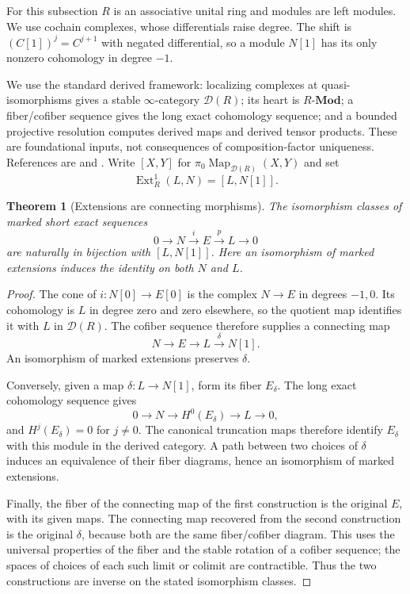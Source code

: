 \documentclass[11pt]{article}
\newtheorem{theorem}{Theorem}[section]
\theoremstyle{definition}
\theoremstyle{remark}\newtheorem{remark}[theorem]{Remark}
\begin{document}
For this subsection $R$ is an associative unital ring and modules are left
modules.  We use cochain complexes, whose differentials raise degree.
The shift is $(C[1])^j=C^{j+1}$ with negated differential, so a module
$N[1]$ has its only nonzero cohomology in degree $-1$.

We use the standard derived framework: localizing complexes at
quasi-isomorphisms gives a stable $\infty$-category $\mathcal D(R)$;
its heart is $R\text{-}\mathbf{Mod}$; a fiber/cofiber sequence gives the
long exact cohomology sequence; and a bounded projective resolution
computes derived maps and derived tensor products.  These are foundational
inputs, not consequences of composition-factor uniqueness.  References
are \cite[\S1.3]{HA} and \cite[Tags 06XP, 0643]{Stacks}.
Write $[X,Y]$ for $\pi_0\operatorname{Map}_{\mathcal D(R)}(X,Y)$ and set
\[
 \operatorname{Ext}^1_R(L,N)=[L,N[1]].
\]

\begin{theorem}[Extensions are connecting morphisms]
\label{t:extension-classification}
The isomorphism classes of marked short exact sequences
\[
 0\longrightarrow N\xrightarrow{i}E\xrightarrow{p}L\longrightarrow0
\]
are naturally in bijection with $[L,N[1]]$.  Here an isomorphism of marked
extensions induces the identity on both $N$ and $L$.
\end{theorem}
\begin{proof}
The cone of $i:N[0]\to E[0]$ is the complex $N\to E$ in degrees
$-1,0$.  Its cohomology is $L$ in degree zero and zero elsewhere, so
the quotient map identifies it with $L$ in $\mathcal D(R)$.  The cofiber
sequence therefore supplies a connecting map
\[
 N\longrightarrow E\longrightarrow L\xrightarrow{\delta}N[1].
\]
An isomorphism of marked extensions preserves $\delta$.

Conversely, given a map $\delta:L\to N[1]$, form its fiber $E_\delta$.
The long exact cohomology sequence gives
\[
 0\longrightarrow N\longrightarrow H^0(E_\delta)
 \longrightarrow L\longrightarrow0,
\]
and $H^j(E_\delta)=0$ for $j\neq0$.  The canonical truncation maps
therefore identify $E_\delta$ with this module in the derived category.
A path between two choices of $\delta$ induces an equivalence of their
fiber diagrams, hence an isomorphism of marked extensions.

Finally, the fiber of the connecting map of the first construction is
the original $E$, with its given maps.  The connecting map recovered
from the second construction is the original $\delta$, because both
are the same fiber/cofiber diagram.  This uses the universal properties
of the fiber and the stable rotation of a cofiber sequence; the spaces
of choices of each such limit or colimit are contractible.  Thus the
two constructions are inverse on the stated isomorphism classes.
\end{proof}
\end{document}
